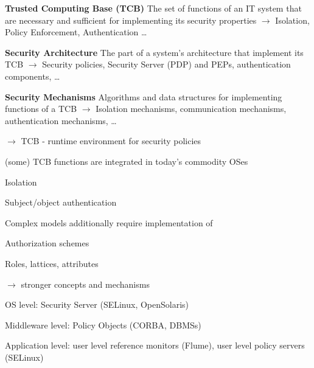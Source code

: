 \documentclass[a4paper]{article}
\renewcommand{\note}[2]{\begin{noteBox} \textbf{#1} #2 \end{noteBox}}
\begin{document}
\begin{multicols}{3}
    \note{Trusted Computing Base (TCB)}{The set of functions of an IT system that are necessary and sufficient for implementing its security properties $\rightarrow$ Isolation, Policy Enforcement, Authentication \dots }

    \note{Security Architecture}{The part of a system’s architecture that implement its TCB $\rightarrow$ Security policies, Security Server (PDP) and PEPs, authentication components, \dots }

    \note{Security Mechanisms}{Algorithms and data structures for implementing functions of a TCB $\rightarrow$ Isolation mechanisms, communication mechanisms, authentication mechanisms, \dots }

    $\rightarrow$ TCB - runtime environment for security policies

    \begin{itemize*}
        \item (some) TCB functions are integrated in today's commodity OSes
        \begin{itemize*}
            \item Isolation
            \item Subject/object authentication
        \end{itemize*}
        \item Complex models additionally require implementation of
        \begin{itemize*}
            \item Authorization schemes
            \item Roles, lattices, attributes
            \item[$\rightarrow$] stronger concepts and mechanisms
            \item OS level: Security Server (SELinux, OpenSolaris)
            \item Middleware level: Policy Objects (CORBA, DBMSs)
            \item Application level: user level reference monitors (Flume), user level policy servers (SELinux)
        \end{itemize*}
    \end{itemize*}


\end{multicols}
\end{document}
